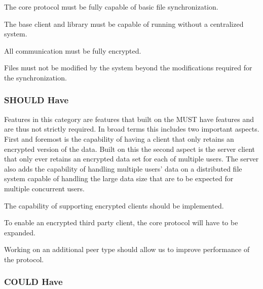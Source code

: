 \begin{description}[leftmargin=16em,style=nextline,noitemsep,nolistsep]
\item[File Synchronization Protocol]
    The core protocol must be fully capable of basic file synchronization.
\item[Peer to Peer Architecture]
    The base client and library must be capable of running without a centralized system.
\item[Secure Transport]
    All communication must be fully encrypted.
\item[Object Atomicity]
    Files must not be modified by the system beyond the modifications required for the synchronization.
\end{description}

\subsubsection{SHOULD Have}
\label{subs:SHOULD Have}

Features in this category are features that built on the MUST have features and are thus not strictly required.
In broad terms this includes two important aspects.
First and foremost is the capability of having a client that only retains an encrypted version of the data.
Built on this the second aspect is the server client that only ever retains an encrypted data set for each of multiple users.
The server also adds the capability of handling multiple users' data on a distributed file system capable of handling the large data size that are to be expected for multiple concurrent users.

\begin{description}[leftmargin=10em,style=nextline,noitemsep,nolistsep]
\item[Third Party Client]
    The capability of supporting encrypted clients should be implemented.
\item[Protocol Extension]
    To enable an encrypted third party client, the core protocol will have to be expanded.
\item[Performance]
    Working on an additional peer type should allow us to improve performance of the protocol.
\end{description}

\subsubsection{COULD Have}
\label{subs:COULD Have}

